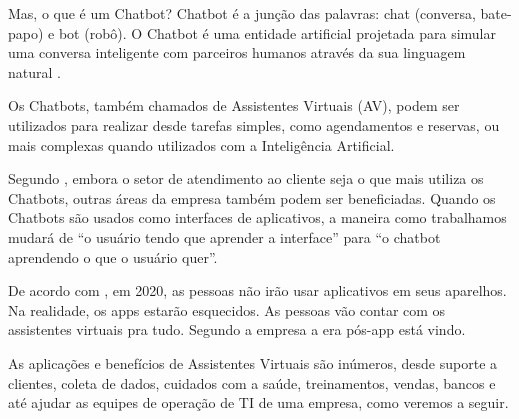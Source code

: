 \documentclass[quali]{mpit}
\begin{document}
Mas, o que é um Chatbot? Chatbot é a junção das palavras: chat (conversa, bate-papo) e bot (robô). O Chatbot é uma entidade artificial projetada para simular uma conversa inteligente com parceiros humanos através da sua
linguagem natural \cite{Reshmi2016ImplementationBases}.

Os Chatbots, também chamados de Assistentes Virtuais (AV), podem ser utilizados para realizar desde tarefas simples, como agendamentos e reservas, ou mais complexas quando utilizados com a Inteligência Artificial.

Segundo \cite{Gartner2018GartnerYears}, embora o setor de atendimento ao cliente seja o que mais utiliza os Chatbots, outras áreas da empresa também podem ser beneficiadas. Quando os Chatbots são usados como interfaces de aplicativos, a maneira como trabalhamos mudará de ``o usuário tendo que aprender a interface'' para  ``o chatbot aprendendo o que o usuário quer''. 

De acordo com \cite{GatewaySun2016Gartner:Robots},  em 2020, as pessoas não irão usar aplicativos em seus aparelhos. Na realidade, os apps estarão esquecidos. As pessoas vão contar com os assistentes virtuais pra tudo. Segundo a empresa a era pós-app está vindo.

As aplicações e benefícios de Assistentes Virtuais são inúmeros, desde suporte a clientes, coleta de dados, cuidados com a saúde, treinamentos, vendas, bancos e até ajudar as equipes de operação de TI de uma empresa, como veremos a seguir. 
\end{document}
